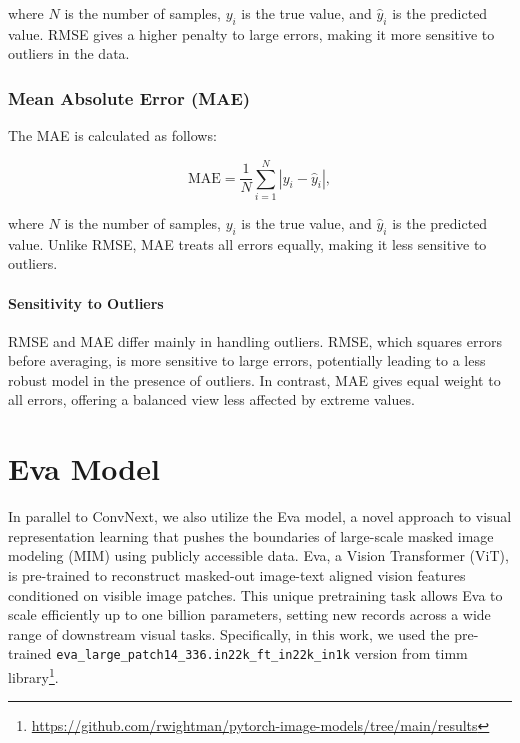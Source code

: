\documentclass[a4paper,12pt,openright]{book}
\begin{document}
where \(N\) is the number of samples, \(y_{i}\) is the true value, and \(\hat{y}_{i}\) is the predicted value. RMSE gives a higher penalty to large errors, making it more sensitive to outliers in the data.

\subsubsection{Mean Absolute Error (MAE)}

The MAE is calculated as follows:

\begin{equation}
\text{MAE} = \frac{1}{N} \sum_{i=1}^{N} |y_{i} - \hat{y}_{i}|,
\end{equation}

where \(N\) is the number of samples, \(y_{i}\) is the true value, and \(\hat{y}_{i}\) is the predicted value. Unlike RMSE, MAE treats all errors equally, making it less sensitive to outliers.

\paragraph{Sensitivity to Outliers}

RMSE and MAE differ mainly in handling outliers. RMSE, which squares errors before averaging, is more sensitive to large errors, potentially leading to a less robust model in the presence of outliers. In contrast, MAE gives equal weight to all errors, offering a balanced view less affected by extreme values.



\newpage
\section{Eva Model}
\label{sec:eva}

In parallel to ConvNext, we also utilize the Eva model, a novel approach to visual representation learning that pushes the boundaries of large-scale masked image modeling (MIM) using publicly accessible data. Eva, a Vision Transformer (ViT), is pre-trained to reconstruct masked-out image-text aligned vision features conditioned on visible image patches. This unique pretraining task allows Eva to scale efficiently up to one billion parameters, setting new records across a wide range of downstream visual tasks. Specifically, in this work, we used the pre-trained \texttt{eva\_large\_patch14\_336.in22k\_ft\_in22k\_in1k} 
version from timm library\footnote{\label{timm2}\url{https://github.com/rwightman/pytorch-image-models/tree/main/results}}.
\end{document}

